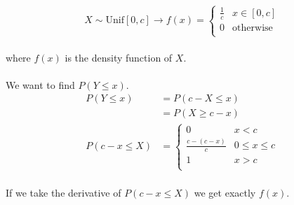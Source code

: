 \documentclass[letterpaper,12pt]{article}
\begin{document}
\begin{enumerate}
    \[
        X \sim \mathrm{Unif}[0,c] \to 
        f(x) = \begin{cases}
            \frac{1}{c} & x \in [0,c] \\
            0 & \mathrm{otherwise}\\
            \end{cases}
    \]

    \paragraph{}where $f(x)$ is the density function of $X$.
    \paragraph{}We want to find $P(Y\le x)$.
    \begin{align*}
        P(Y\le x) &= P(c -X \le x)\\
                  &= P(X \ge c-x)\\
         P(c-x \le X)&=
                   \begin{cases}
                      0 & x < c \\
                      \frac{c-(c-x)}{c} & 0 \le x \le c \\
                      1 & x > c \\
                      \end{cases}
    \end{align*}
    \paragraph{}If we take the derivative of $P(c-x \le X)$ we get exactly $f(x)$.
\end{enumerate}
\end{document}
